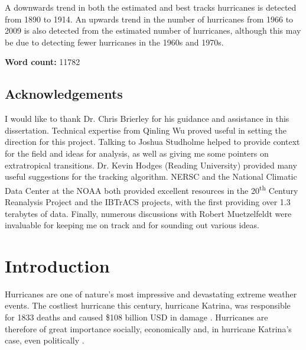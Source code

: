 \documentclass[pdftex,12pt,a4paper]{report}
\newcommand{\ts}{\textsuperscript}
\begin{document}
A downwards trend in both the estimated and best tracks hurricanes is detected from 1890 to 1914. An
upwards trend in the number of hurricanes from 1966 to 2009 is also detected from the estimated
number of hurricanes, although this may be due to detecting fewer hurricanes in the 1960s and 1970s.

\begin{center}
\textbf{Word count:} 11782 %
\end{center}

\newpage
\section*{Acknowledgements}

I would like to thank Dr. Chris Brierley for his guidance and assistance in this dissertation.
Technical expertise from Qinling Wu proved useful in setting the direction for this project.
Talking to Joshua Studholme helped to provide context for the field and ideas for analysis, as well
as giving me some pointers on extratropical transitions.
Dr. Kevin Hodges (Reading University) provided many useful suggestions for the tracking algorithm.
NERSC and the National Climatic Data Center at the NOAA both provided excellent resources in the
20\ts{th} Century Reanalysis Project and the IBTrACS projects, with the first providing over 1.3
terabytes of data.
Finally, numerous discussions with Robert Muetzelfeldt were invaluable for keeping me on track and
for sounding out various ideas.

\newpage

\tableofcontents

\chapter{Introduction}


Hurricanes are one of nature's most impressive and devastating extreme weather events. The costliest
hurricane this century, hurricane Katrina, was responsible for 1833 deaths and caused \$108
billion USD in damage \parencite{knabb2006tropical}.
Hurricanes are therefore of great importance socially,
economically and, in hurricane Katrina's case, even politically \parencite{kellner2007katrina}.
\end{document}
